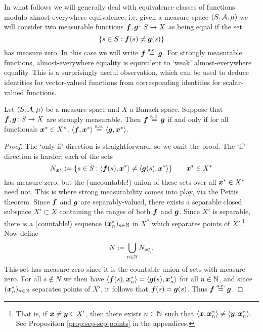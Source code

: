 In what follows we will generally deal with equivalence classes of functions modulo almost-everywhere equivalence, i.e. given a measure space $(S,\mathcal{A},\mu)$ we will consider two measurable functions $\bm{f},\bm{g} \colon S \rightarrow X$ as being equal if the set
\begin{equation*}
  \{s \in S : \bm{f}(s) \neq \bm{g}(s)\}
\end{equation*}
has measure zero.
In this case we will write $\bm{f} \stackrel{\mathrm{a.e.}}{=} \bm{g}$.
For strongly measurable functions, almost-everywhere equality is equivalent to `weak' almost-everywhere equality.
This is a surprisingly useful observation, which can be used to deduce identities for vector-valued functions from corresponding identities for scalar-valued functions.

\begin{lem}\label{lem:coordinatewise-equality-test}
  Let $(S,\mathcal{A},\mu)$ be a measure space and $X$ a Banach space.
  Suppose that $\bm{f},\bm{g} \colon S \rightarrow X$ are strongly measurable.
  Then $\bm{f} \stackrel{\mathrm{a.e.}}{=} \bm{g}$ if and only if for all functionals $\bm{x}^* \in X^*$, $\langle \bm{f}, \bm{x}^*\rangle \stackrel{\mathrm{a.e.}}{=} \langle \bm{g}, \bm{x}^* \rangle$.
\end{lem}

\begin{proof}
  The `only if' direction is straightforward, so we omit the proof.
  The `if' direction is harder: each of the sets
  \begin{equation*}
    N_{\bm{x}^*} := \{s \in S : \langle \bm{f}(s), \bm{x}^* \rangle \neq \langle \bm{g}(s), \bm{x}^* \rangle\} \qquad \bm{x}^* \in X^*
  \end{equation*}
  has measure zero, but the (uncountable!) union of these sets over all $\bm{x}^* \in X^*$ need not.
  This is where strong measurability comes into play, via the Pettis theorem.
  Since $\bm{f}$ and $\bm{g}$ are separably-valued, there exists a separable closed subspace $X' \subset X$ containing the ranges of both $\bm{f}$ and $\bm{g}$.
  Since $X'$ is separable, there is a (countable!) sequence $(\bm{x}_n^*)_{n \in \mathbb{N}}$ in $X^*$ which separates points of $X'$.\footnote{That is, if $\bm{x} \neq \bm{y} \in X'$, then there exists $n \in \mathbb{N}$ such that $\langle \bm{x}, \bm{x}_n^* \rangle \neq \langle \bm{y}, \bm{x}_n^* \rangle$. See Proposition \ref{prop:sep-sep-points} in the appendices.}
  Now define
  \begin{equation*}
    N := \bigcup_{n \in \mathbb{N}} N_{\bm{x}_n^*}.
  \end{equation*}
  This set has measure zero since it is the countable union of sets with measure zero.
  For all $s \notin N$ we then have $\langle \bm{f}(s), \bm{x}_n^* \rangle = \langle \bm{g}(s), \bm{x}_n^* \rangle$ for all $n \in \mathbb{N}$, and since $(\bm{x}_n^*)_{n \in \mathbb{N}}$ separates points of $X'$, it follows that $\bm{f}(s) = \bm{g}(s)$.
  Thus $\bm{f} \stackrel{\mathrm{a.e.}}{=} \bm{g}$.  
\end{proof}

